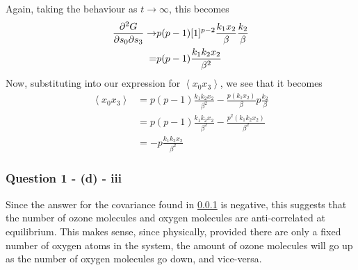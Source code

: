 \documentclass[11pt,a4paper]{article}
\begin{document}
Again, taking the behaviour as $t \rightarrow \infty$, this becomes
\begin{align*}
\pdv{G}{s_0}{s_3} \rightarrow & p ( p-1) [1]^{p-2} \frac{k_1 x_2}{\beta} \frac{k_2}{\beta} \\
= & p (p-1) \frac{k_1 k_2 x_2}{\beta^2}
\end{align*}
Now, substituting into our expression for $\left\langle x_0 x_3 \right \rangle$, we see that it becomes
\begin{align*}
\left\langle x_0 x_3 \right \rangle &= p (p-1) \frac{k_1 k_2 x_2}{\beta^2} - \frac{p (k_1 x_2)}{\beta} p \frac{k_2}{\beta} \\
&= p (p-1) \frac{k_1 k_2 x_2}{\beta^2} - \frac{p^2 (k_1 k_2 x_2) }{\beta^2} \\
&= - p \frac{k_1 k_2 x_2}{\beta^2}
\end{align*}
\subsubsection{Question 1 - (d) - iii}
\label{sec:question1:subsec:partd:subsub:iii}
Since the answer for the covariance found in \ref{sec:question1:subsec:partd:subsub:iii} is negative, this suggests that the number of ozone molecules and oxygen molecules are anti-correlated at equilibrium. This makes sense, since physically, provided there are only a fixed number of oxygen atoms in the system, the amount of ozone molecules will go up as the number of oxygen molecules go down, and vice-versa. 
\end{document}
